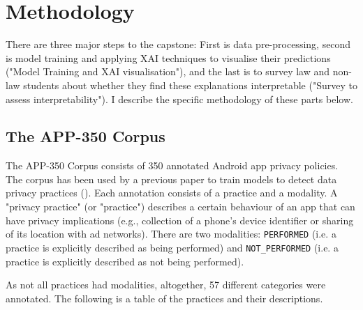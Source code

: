 
\chapter{Methodology} %

\label{Chapter3} %

There are three major steps to the capstone: First is data pre-processing, second is model training and applying XAI techniques to visualise their predictions ("Model Training and XAI visualisation"), and the last is to survey law and non-law students about whether they find these explanations interpretable ("Survey to assess interpretability"). I describe the specific methodology of these parts below.

\section{The APP-350 Corpus}
The APP-350 Corpus consists of 350 annotated Android app privacy policies. The corpus has been used by a previous paper to train models to detect data privacy practices (\cite{zimmeck2019}). Each annotation consists of a practice and a modality. A "privacy practice" (or "practice") describes a certain behaviour of an app that can have privacy implications (e.g., collection of a phone's device identifier or sharing of its location with ad networks). There are two modalities: \texttt{PERFORMED} (i.e. a practice is explicitly described as being performed) and \texttt{NOT\_PERFORMED} (i.e. a practice is explicitly described as not being performed).

As not all practices had modalities, altogether, 57 different categories were annotated. The following is a table of the practices and their descriptions.

